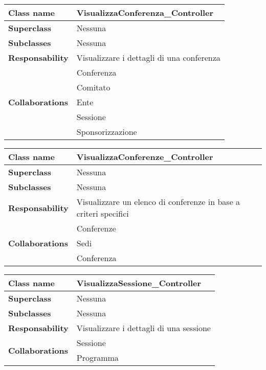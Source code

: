 \begin{table}[h!]
	\begin{tabular}{|l|l|}
		\hline 
		\textbf{Class name} & VisualizzaConferenza\_Controller
		\\ \hline
		\textbf{Superclass} & Nessuna
		\\ \hline
		\multirow{1}{*}{\textbf{Subclasses}} & Nessuna
		\\ \hline
		\textbf{Responsability} & Visualizzare i dettagli di una conferenza
		\\ \hline
		\multirow{5}{*}{\textbf{Collaborations}} & Conferenza\\
		& Comitato\\
		& Ente \\
		& Sessione \\
		& Sponsorizzazione
		\\ \hline
	\end{tabular}
\end{table} 

\begin{table}[h!]
	\begin{tabular}{|l|l|}
		\hline 
		\textbf{Class name} & VisualizzaConferenze\_Controller
		\\ \hline
		\textbf{Superclass} & Nessuna
		\\ \hline
		\multirow{1}{*}{\textbf{Subclasses}} & Nessuna
		\\ \hline
		\textbf{Responsability} & Visualizzare un elenco di conferenze in base a criteri specifici
		\\ \hline
		\multirow{3}{*}{\textbf{Collaborations}} & Conferenze\\
		& Sedi\\
		& Conferenza
		\\ \hline
	\end{tabular}
\end{table} 

\begin{table}[h!]
	\begin{tabular}{|l|l|}
		\hline 
		\textbf{Class name} & VisualizzaSessione\_Controller
		\\ \hline
		\textbf{Superclass} & Nessuna
		\\ \hline
		\multirow{1}{*}{\textbf{Subclasses}} & Nessuna
		\\ \hline
		\textbf{Responsability} & Visualizzare i dettagli di una sessione
		\\ \hline
		\multirow{2}{*}{\textbf{Collaborations}} & Sessione\\
		& Programma
		\\ \hline
	\end{tabular}
\end{table} 